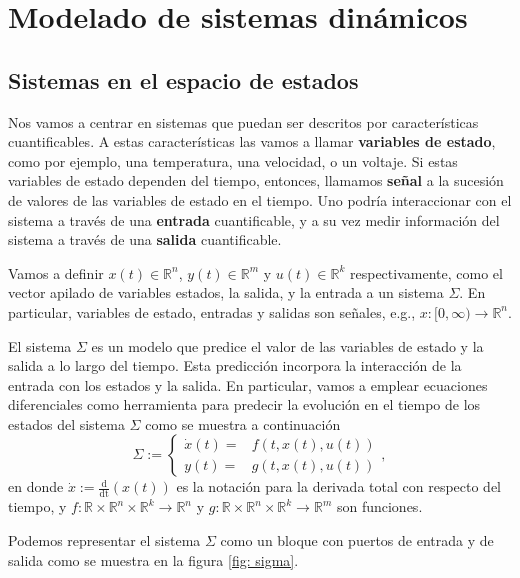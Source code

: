 \chapter{Modelado de sistemas dinámicos}\label{modelado}

\section{Sistemas en el espacio de estados}
Nos vamos a centrar en sistemas que puedan ser descritos por características cuantificables. A estas características las vamos a llamar {\bf variables de estado}, como por ejemplo, una temperatura, una velocidad, o un voltaje. Si estas variables de estado dependen del tiempo, entonces, llamamos {\bf señal} a la sucesión de valores de las variables de estado en el tiempo. Uno podría interaccionar con el sistema a través de una {\bf entrada} cuantificable, y a su vez medir información del sistema a través de una {\bf salida} cuantificable.

Vamos a definir $x(t)\in\mathbb{R}^n$, $y(t)\in\mathbb{R}^m$ y $u(t)\in\mathbb{R}^k$ respectivamente, como el vector apilado de variables estados, la salida, y la entrada a un sistema $\Sigma$. En particular, variables de estado, entradas y salidas son señales, e.g., $x :[0,\infty) \to \mathbb{R}^n$.

El sistema $\Sigma$ es un modelo que predice el valor de las variables de estado y la salida a lo largo del tiempo. Esta predicción incorpora la interacción de la entrada con los estados y la salida. En particular, vamos a emplear ecuaciones diferenciales como herramienta para predecir la evolución en el tiempo de los estados del sistema $\Sigma$ como se muestra a continuación
\begin{equation}
	\Sigma := \begin{cases}
		\dot x(t) =& f(t,x(t),u(t)) \\ y(t) =& g(t,x(t),u(t))
	\end{cases}, 
\label{eq: sigma}
\end{equation}
en donde $\dot x := \frac{\mathrm{d}}{\mathrm{dt}}(x(t))$ es la notación para la derivada total con respecto del tiempo, y $f:\mathbb{R} \times \mathbb{R}^n \times \mathbb{R}^k \to \mathbb{R}^n$ y $g: \mathbb{R} \times \mathbb{R}^n \times \mathbb{R}^k \to \mathbb{R}^m$ son funciones.

Podemos representar el sistema $\Sigma$ como un bloque con puertos de entrada y de salida como se muestra en la figura \ref{fig: sigma}.

